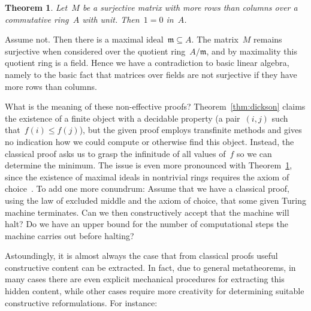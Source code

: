 \documentclass[10pt,reqno,a4paper,openany]{amsbook}
\makeatletter
\theoremstyle{definition}
\theoremstyle{plain}
\newtheorem{thm}[defn]{Theorem}
\theoremstyle{remark}
\newcommand{\mmm}{\mathfrak{m}}
\newcommand{\?}{\,{:}\,}
\renewcommand{\_}{\mathpunct{.}\,}
\renewenvironment{proof}[1][\proofname]{\par
  \pushQED{\qed}%
  \normalfont \topsep6\p@\@plus6\p@\relax
  \trivlist
  \item[\hskip\labelsep
        \itshape
    #1\@addpunct{.}]\ignorespaces
}{%
  \popQED\endtrivlist\@endpefalse
}
\makeatother
\begin{document}
\begin{thm}\label{thm:surjective-matrix}
Let~$M$ be a surjective matrix with more rows than columns over a commutative
ring~$A$ with unit. Then~$1 = 0$ in~$A$.
\end{thm}

\begin{proof}[Proof (classical)]Assume not. Then there is a maximal
ideal~$\mmm \subseteq A$. The matrix~$M$ remains surjective when considered over
the quotient ring~$A/\mmm$, and by maximality this quotient ring is a field.
Hence we have a contradiction to basic linear algebra, namely to the basic fact
that matrices over fields are not surjective if they have more rows than
columns.\end{proof}

What is the meaning of these non-effective proofs? Theorem~\ref{thm:dickson}
claims the existence of a finite object with a decidable property (a
pair~$(i,j)$ such that~$f(i) \leq f(j)$), but the given proof employs
transfinite methods and gives no indication how we could compute or otherwise
find this object. Instead, the classical proof asks us to grasp the infinitude
of all values of~$f$ so we can determine the minimum. The issue is even more
pronounced with Theorem~\ref{thm:surjective-matrix}, since the existence of
maximal ideals in nontrivial rings requires the axiom of
choice~\cite{scott:prime-ideals,hodges:krull,banaschewski:krull,erne:krull,howard-rubin:ac}.
To add one more conundrum: Assume that we have a classical proof, using the law
of excluded middle and the axiom of choice, that some given Turing machine
terminates. Can we then constructively accept that the machine will halt? Do we
have an upper bound for the number of computational steps the machine carries
out before halting?

Astoundingly, it is almost always the case that from classical proofs useful
constructive content can be extracted. In fact, due to general metatheorems,
in many cases there are even explicit mechanical procedures for extracting this
hidden content, while other cases require more creativity for determining
suitable constructive reformulations. For instance:

\end{document}
